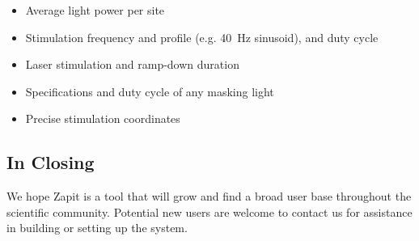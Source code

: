 \begin{itemize}
    \item Average light power per site
    \item Stimulation frequency and profile (e.g. 40~Hz sinusoid), and duty cycle
    \item Laser stimulation and ramp-down duration
    \item Specifications and duty cycle of any masking light
    \item     Precise stimulation coordinates 

\end{itemize}

\subsection{In Closing}
We hope Zapit is a tool that will grow and find a broad user base throughout the scientific community.
Potential new users are welcome to contact us for assistance in building or setting up the system. 
